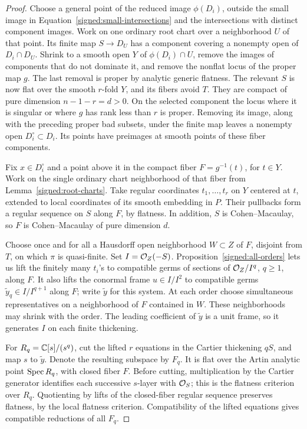 \begin{proof}
Choose a general point of the reduced image \(\phi(D_i)\),
outside the small image in
Equation~\eqref{signed:small-intersections} and the intersections
with distinct component images.  Work on one ordinary root
chart over a neighborhood \(U\) of that point.  Its finite
map \(S\to D_U\) has a component covering a nonempty open of
\(D_i\cap D_U\).  Shrink to a smooth open \(Y\) of
\(\phi(D_i)\cap U\), remove the images of components that
do not dominate it, and remove the nonflat locus of the
proper map \(g\).  The last removal is proper by analytic
generic flatness.  The relevant \(S\) is now flat over the
smooth \(r\)-fold \(Y\), and its fibers avoid \(T\).
They are compact of pure dimension \(n-1-r=d>0\).
On the selected component the locus where it is singular or
where \(g\) has rank less than \(r\) is proper.  Removing its
image, along with the preceding proper bad subsets, under the
finite map leaves a nonempty open \(D_i^\circ\subset D_i\).
Its points have preimages at smooth points of these fiber
components.

Fix \(x\in D_i^\circ\) and a point above it in the compact
fiber \(F=g^{-1}(t)\), for \(t\in Y\).  Work on the single
ordinary chart neighborhood of that fiber from
Lemma~\ref{signed:root-charts}.  Take regular coordinates
\(t_1,\ldots,t_r\) on \(Y\) centered at \(t\), extended to
local coordinates of its smooth embedding in \(P\).  Their
pullbacks form a regular sequence on \(S\) along \(F\),
by flatness.  In addition, \(S\) is Cohen--Macaulay, so
\(F\) is Cohen--Macaulay of pure dimension \(d\).

Choose once and for all a Hausdorff open neighborhood
\(W\subset Z\) of \(F\), disjoint from \(T\), on which
\(\pi\) is quasi-finite.  Set \(I=\mathcal O_Z(-S)\).
Proposition~\ref{signed:all-orders} lets us lift the finitely
many \(t_i\)'s to compatible germs of sections of \(\mathcal O_Z/I^q\),
\(q\geq1\), along \(F\).  It also lifts the conormal frame
\(u\in I/I^2\) to compatible germs
\(\widetilde y_q\in I/I^{q+1}\) along \(F\); write \(\widetilde y\)
for this system.  At each order choose simultaneous
representatives on a neighborhood of \(F\) contained in
\(W\).  These neighborhoods may shrink with the order.
The leading coefficient of \(\widetilde y\) is a unit
frame, so it generates \(I\) on each finite thickening.

For \(R_q=\mathbb C[s]/(s^q)\), cut the lifted \(r\) equations in
the Cartier thickening \(qS\), and map \(s\) to
\(\widetilde y\).  Denote the resulting subspace by
\(F_q\).  It is flat over the Artin analytic point
\(\operatorname{Spec} R_q\), with closed fiber \(F\).  Before cutting,
multiplication by the Cartier generator identifies each
successive \(s\)-layer with \(\mathcal O_S\); this is the
flatness criterion over \(R_q\).  Quotienting by lifts of
the closed-fiber regular sequence preserves flatness, by
the local flatness criterion.  Compatibility of the lifted
equations gives compatible reductions of all \(F_q\).


\end{proof}
